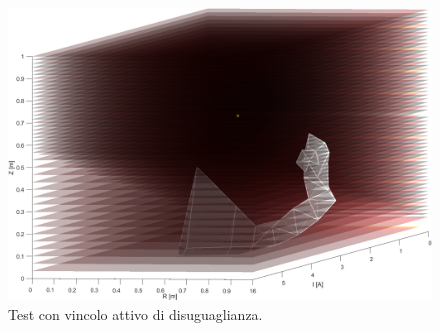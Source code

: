 \documentclass[a4paper, 11pt]{article}
\begin{document}
\begin{figure}[H]
	\centering
		\includegraphics[width=13cm]{assets/figure9}
		\caption{Test con vincolo attivo di disuguaglianza.}
\end{figure}
\noindent
\end{document}
